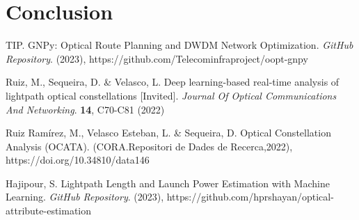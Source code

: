 \documentclass[lettersize,journal, one-column]{IEEEtran}
\begin{document}
\section{Conclusion}
\label{section:conclusion}



\begin{thebibliography}{1}


TIP. GNPy: Optical Route Planning and DWDM Network Optimization. {\em GitHub Repository}. (2023), https://github.com/Telecominfraproject/oopt-gnpy

Ruiz, M., Sequeira, D. \& Velasco, L. Deep learning-based real-time analysis of lightpath optical constellations [Invited]. {\em Journal Of Optical Communications And Networking}. \textbf{14}, C70-C81 (2022)

Ruiz Ramírez, M., Velasco Esteban, L. \& Sequeira, D. Optical Constellation Analysis (OCATA). (CORA.Repositori de Dades de Recerca,2022), https://doi.org/10.34810/data146

Hajipour, S. Lightpath Length and Launch Power Estimation with Machine Learning. {\em GitHub Repository}. (2023), https://github.com/hprshayan/optical-attribute-estimation




\end{thebibliography}
\end{document}

